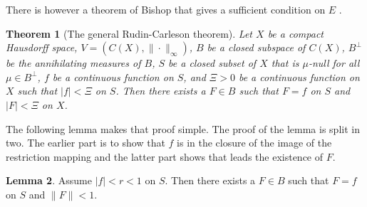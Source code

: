 \documentclass[a4paper,12pt,twoside,BCOR=10mm]{scrbook}
\newtheorem{theorem}{Theorem}[section]
\theoremstyle{definition}
\theoremstyle{definition}
\newtheorem{lemma}[theorem]{Lemma}
\theoremstyle{definition}
\begin{document}
There is however a theorem of Bishop that gives a sufficient condition on $E$ \citep{bishop}.
\begin{theorem}[The general Rudin-Carleson theorem]
\label{bishopstheorem}
Let $X$ be a compact Hausdorff space,
	$V = (C(X), \| \cdot \|_{\infty})$,
	$B$ be a closed subspace of $C(X)$,
	$B^{\bot}$ be the annihilating measures of $B$,
	$S$ be a closed subset of $X$ that is $\mu$-null for all $\mu \in B^{\bot}$, %
	$f$ be a continuous function on $S$,
	and $\Xi > 0$ be a continuous function on $X$ such that $|f| < \Xi$ on $S$.
Then there exists a $F \in B$ such that $F = f$ on $S$ and $|F| < \Xi$ on $X$.
\end{theorem}
The following lemma makes that proof simple.
The proof of the lemma is split in two.
The earlier part is to show that $f$ is in the closure of the image of the restriction mapping and the latter part shows that leads the existence of $F$.
\begin{lemma}
\label{bishoplemma}
Assume $|f| < r < 1$ on $S$.
Then there exists a $F \in B$ such that $F = f$ on $S$ and $\|F\| < 1$.
\end{lemma}
\end{document}
